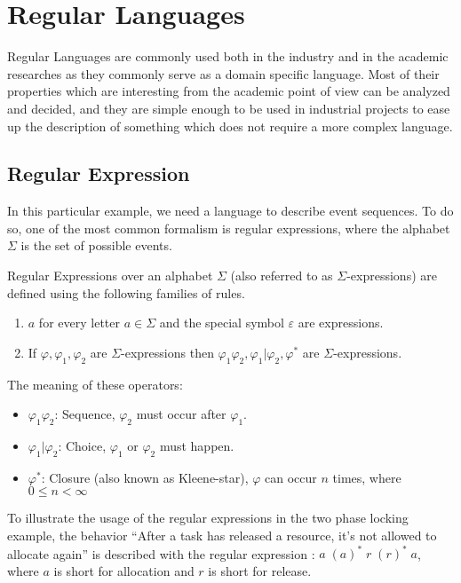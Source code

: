 	\section{Regular Languages}
	
		Regular Languages are commonly used both in the industry and in the academic researches as they commonly serve as a domain specific language.
		Most of their properties which are interesting from the academic point of view can be analyzed and decided, and they are simple enough to be used in industrial projects to ease up the description of something which does not require a more complex language.
	
		\subsection{Regular Expression}
		
			In this particular example, we need a language to describe event sequences. To do so, one of the most common formalism is regular expressions, where the alphabet $\Sigma$ is the set of possible events.
	
			
			\begin{dfn}
				\label{dfn:cep:re}
				Regular Expressions over an alphabet $\Sigma$ (also referred to as $\Sigma$-expressions)
				are defined using the following families of rules.
				\begin{enumerate}
					\item $a$ for every letter $a \in \Sigma$ and the special symbol $\varepsilon$ are expressions.
					\item If $\varphi, \varphi_1, \varphi_2$ are $\Sigma$-expressions then %
						$ %
						\varphi_1 \varphi_2,
						\varphi_1 | \varphi_2,
						\varphi^\ast
						$ are $\Sigma$-expressions\citep{tre}.
				\end{enumerate}
			\end{dfn}
	
			The meaning of these operators:
			\begin{itemize}
				\item $\varphi_1 \varphi_2$: Sequence, $\varphi_2$ must occur after $\varphi_1$.
				\item $\varphi_1 | \varphi_2$: Choice, $\varphi_1$ or $\varphi_2$ must happen.
				\item $\varphi^\ast$: Closure (also known as Kleene-star), $\varphi$ can occur $n$ times, where $0 \leq n < \infty$
			\end{itemize}
			
	
			To illustrate the usage of the regular expressions in the two phase locking example, the behavior ``After a task has released a resource, it's not allowed to allocate again'' is described with the regular expression : $a \; (a)^* \; r \; (r)^* \; a $, where $a$ is short for allocation and $r$ is short for release.
	
